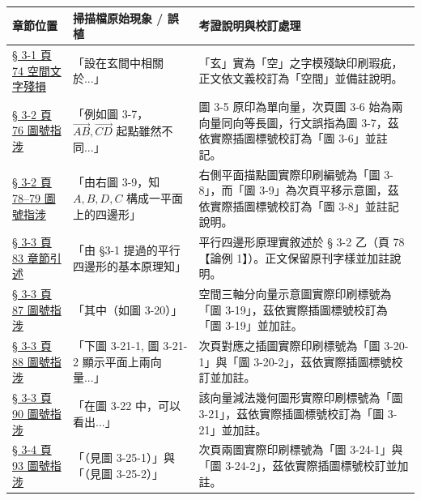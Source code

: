 \documentclass[a4paper,12pt,twoside]{article}
\begin{document}
\begin{table}[H]
\centering
\small
\renewcommand{\arraystretch}{1.35}
\begin{tabularx}{\textwidth}{|p{3.2cm}|p{3.8cm}|X|}
\hline
\textbf{章節位置} & \textbf{掃描檔原始現象 / 誤植} & \textbf{考證說明與校訂處理} \\ \hline

\hyperref[note:b3-ch3-p74-space-font]{§ 3-1 頁 74 空間文字殘損} & 
「設在玄間中相關於...」 & 
「玄」實為「空」之字模殘缺印刷瑕疵，正文依文義校訂為「空間」並備註說明。 \\ \hline

\hyperref[note:b3-ch3-p76-fig-ref]{§ 3-2 頁 76 圖號指涉} & 
「例如圖 3-7，$\vec{AB},\vec{CD}$ 起點雖然不同...」 & 
圖 3-5 原印為單向量，次頁圖 3-6 始為兩向量同向等長圖，行文誤指為圖 3-7，茲依實際插圖標號校訂為「圖 3-6」並註記。 \\ \hline

\hyperref[note:b3-ch3-p78-fig3-9]{§ 3-2 頁 78--79 圖號指涉} & 
「由右圖 3-9，知 $A,B,D,C$ 構成一平面上的四邊形」 & 
右側平面描點圖實際印刷編號為「圖 3-8」，而「圖 3-9」為次頁平移示意圖，茲依實際插圖標號校訂為「圖 3-8」並註記說明。 \\ \hline

\hyperref[note:b3-ch3-p83-sec-ref]{§ 3-3 頁 83 章節引述} & 
「由 §3-1 提過的平行四邊形的基本原理知」 & 
平行四邊形原理實敘述於 § 3-2 乙（頁 78【論例 1】）。正文保留原刊字樣並加註說明。 \\ \hline

\hyperref[note:b3-ch3-p87-fig-ref]{§ 3-3 頁 87 圖號指涉} & 
「其中（如圖 3-20）」 & 
空間三軸分向量示意圖實際印刷標號為「圖 3-19」，茲依實際插圖標號校訂為「圖 3-19」並加註。 \\ \hline

\hyperref[note:b3-ch3-p88-fig-ref]{§ 3-3 頁 88 圖號指涉} & 
「下圖 3-21-1, 圖 3-21-2 顯示平面上兩向量...」 & 
次頁對應之插圖實際印刷標號為「圖 3-20-1」與「圖 3-20-2」，茲依實際插圖標號校訂並加註。 \\ \hline

\hyperref[note:b3-ch3-p90-fig-ref]{§ 3-3 頁 90 圖號指涉} & 
「在圖 3-22 中，可以看出...」 & 
該向量減法幾何圖形實際印刷標號為「圖 3-21」，茲依實際插圖標號校訂為「圖 3-21」並加註。 \\ \hline

\hyperref[note:b3-ch3-p93-fig-ref]{§ 3-4 頁 93 圖號指涉} & 
「（見圖 3-25-1）」與「（見圖 3-25-2）」 & 
次頁兩圖實際印刷標號為「圖 3-24-1」與「圖 3-24-2」，茲依實際插圖標號校訂並加註。 \\ \hline


\end{tabularx}
\end{table}
\end{document}
